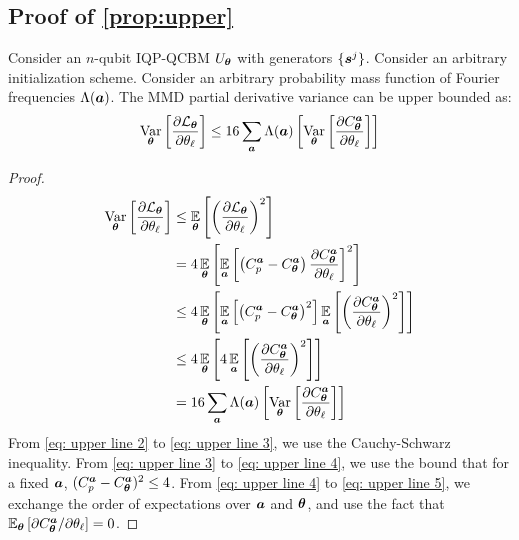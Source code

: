 \documentclass{article}
\theoremstyle{plain}
\theoremstyle{definition}
\theoremstyle{remark}
\begin{document}
\subsection{Proof of \cref{prop:upper}}
Consider an $n$-qubit IQP-QCBM $U_{\bm{\theta}}$ with generators $\{{\bm{s}^j}\}$. Consider an arbitrary initialization scheme. Consider an arbitrary probability mass function of Fourier frequencies $\Lambda({\bm{a}})$. The MMD partial derivative variance can be upper bounded as:
\begin{equation}
    \operatorname*{Var}_{{\bm{\theta}}} \left[ \frac{\partial \mathcal{L}_{\bm{\theta}}}{\partial \theta_\ell} \right] \leq 16 \sum_{\bm{a}} \Lambda({\bm{a}})\left[  \operatorname*{Var}_{{\bm{\theta}}} \left[ \frac{\partial C^{\bm{a}}_{\bm{\theta}}}{\partial \theta_\ell} \right]\right]
\end{equation}
\begin{proof}
\begin{align}
\operatorname*{Var}_{{\bm{\theta}}} \left[ \frac{\partial \mathcal{L}_{\bm{\theta}}}{\partial \theta_\ell} \right] &\leq \operatorname*{\mathbb{E}}_{{\bm{\theta}}} \left[ \left(\frac{\partial \mathcal{L}_{\bm{\theta}}}{\partial \theta_\ell} \right)^2 \right] \\
&= 4\operatorname*{\mathbb{E}}_{{\bm{\theta}}} \left[  \operatorname*{\mathbb{E}}_{{\bm{a}}}\left[\left( C^{\bm{a}}_p - C^{\bm{a}}_{\bm{\theta}} \right) \frac{\partial C^{\bm{a}}_{\bm{\theta}}}{\partial \theta_\ell} \right]^2  \right] \label{eq: upper line 2}\\
&\leq 4\operatorname*{\mathbb{E}}_{{\bm{\theta}}} \left[  \operatorname*{\mathbb{E}}_{{\bm{a}}}\left[\left( C^{\bm{a}}_p - C^{\bm{a}}_{\bm{\theta}} \right)^2 \right] \operatorname*{\mathbb{E}}_{{\bm{a}}}\left[\left(\frac{\partial C^{\bm{a}}_{\bm{\theta}}}{\partial \theta_\ell} \right)^2\right]\right] \label{eq: upper line 3}\\
&\leq 4\operatorname*{\mathbb{E}}_{{\bm{\theta}}} \left[  4 \operatorname*{\mathbb{E}}_{{\bm{a}}}\left[\left(\frac{\partial C^{\bm{a}}_{\bm{\theta}}}{\partial \theta_\ell} \right)^2\right]\right] \label{eq: upper line 4}\\
&= 16 \sum_{\bm{a}} \Lambda({\bm{a}})\left[  \operatorname*{Var}_{{\bm{\theta}}} \left[ \frac{\partial C^{\bm{a}}_{\bm{\theta}}}{\partial \theta_\ell} \right]\right] \label{eq: upper line 5}
\end{align}
From \cref{eq: upper line 2} to \cref{eq: upper line 3}, we use the Cauchy-Schwarz inequality. From \cref{eq: upper line 3} to \cref{eq: upper line 4}, we use the bound that for a fixed ${\bm{a}}$, $(C^{\bm{a}}_p - C^{\bm{a}}_{\bm{\theta}})^2 \leq 4$. From \cref{eq: upper line 4} to \cref{eq: upper line 5}, we exchange the order of expectations over ${\bm{a}}$ and ${\bm{\theta}}$, and use the fact that $\operatorname*{\mathbb{E}}_{{\bm{\theta}}}\left[\partial C^{\bm{a}}_{\bm{\theta}} / \partial \theta_\ell\right] = 0$.
\end{proof}
\end{document}
